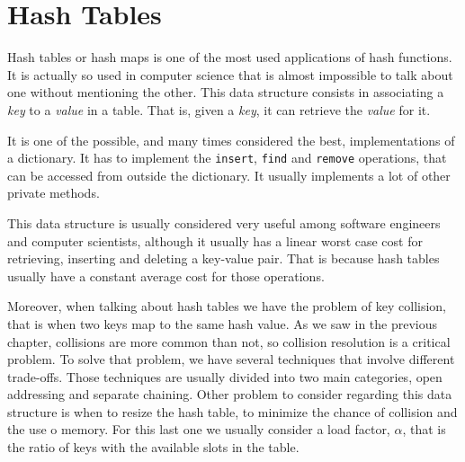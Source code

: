 
\chapter{Hash Tables}
\label{cap:Hash Tables}



Hash tables or hash maps is one of the most used applications of hash functions. It is actually so used in computer science that is almost impossible to talk about one without mentioning the other. This data structure consists in associating a \textit{key} to a \textit{value} in a table. That is, given a \textit{key}, it can retrieve the  \textit{value} for it.

It is one of the possible, and many times considered the best, implementations of a dictionary. It has to implement the \texttt{insert}, \texttt{find} and \texttt{remove} operations, that can be accessed from outside the dictionary. It usually implements a lot of other private methods. 

This data structure is usually considered very useful among software engineers and computer scientists, although it usually has a linear worst case cost for retrieving, inserting and deleting a key-value pair. That is because hash tables usually have a constant average cost for those operations.

Moreover, when talking about hash tables we have the problem of key collision, that is when two keys map to the same hash value. As we saw in the previous chapter, collisions are more common than not, so collision resolution is a critical problem. To solve that problem, we have several techniques that involve different trade-offs. Those techniques are usually divided into two main categories, open addressing and separate chaining. Other problem to consider regarding this data structure is when to resize the hash table, to minimize the chance of collision and the use o memory. For this last one we usually consider a load factor, \( \alpha \), that is the ratio of keys with the available slots in the table.

